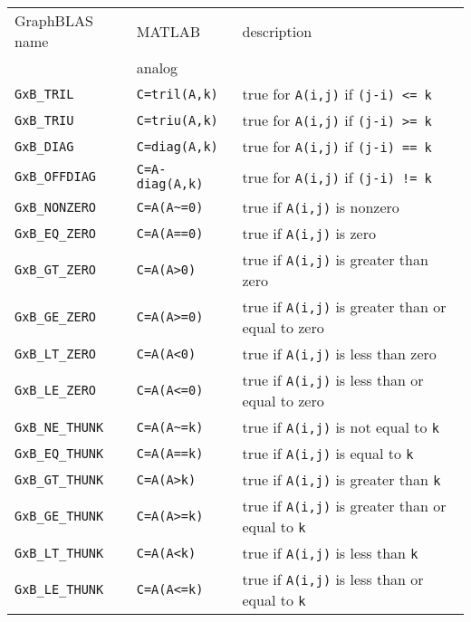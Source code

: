 \documentclass[12pt]{article}
\begin{document}
\vspace{0.2in}
{\footnotesize
\begin{tabular}{lll}
\hline
GraphBLAS name          & MATLAB            & description \\
                        & analog            & \\
\hline
\verb'GxB_TRIL'         & \verb'C=tril(A,k)'   & true for \verb'A(i,j)' if \verb'(j-i) <= k' \\
\verb'GxB_TRIU'         & \verb'C=triu(A,k)'   & true for \verb'A(i,j)' if \verb'(j-i) >= k' \\
\verb'GxB_DIAG'         & \verb'C=diag(A,k)'   & true for \verb'A(i,j)' if \verb'(j-i) == k' \\
\verb'GxB_OFFDIAG'      & \verb'C=A-diag(A,k)' & true for \verb'A(i,j)' if \verb'(j-i) != k' \\
\hline
\verb'GxB_NONZERO'      & \verb'C=A(A~=0)'     & true if \verb'A(i,j)' is nonzero\\
\verb'GxB_EQ_ZERO'      & \verb'C=A(A==0)'     & true if \verb'A(i,j)' is zero\\
\verb'GxB_GT_ZERO'      & \verb'C=A(A>0)'      & true if \verb'A(i,j)' is greater than zero \\
\verb'GxB_GE_ZERO'      & \verb'C=A(A>=0)'     & true if \verb'A(i,j)' is greater than or equal to zero \\
\verb'GxB_LT_ZERO'      & \verb'C=A(A<0)'      & true if \verb'A(i,j)' is less than zero \\
\verb'GxB_LE_ZERO'      & \verb'C=A(A<=0)'     & true if \verb'A(i,j)' is less than or equal to zero \\
\hline
\verb'GxB_NE_THUNK'     & \verb'C=A(A~=k)'     & true if \verb'A(i,j)' is not equal to \verb'k'\\
\verb'GxB_EQ_THUNK'     & \verb'C=A(A==k)'     & true if \verb'A(i,j)' is equal to \verb'k'\\
\verb'GxB_GT_THUNK'     & \verb'C=A(A>k)'      & true if \verb'A(i,j)' is greater than \verb'k' \\
\verb'GxB_GE_THUNK'     & \verb'C=A(A>=k)'     & true if \verb'A(i,j)' is greater than or equal to \verb'k' \\
\verb'GxB_LT_THUNK'     & \verb'C=A(A<k)'      & true if \verb'A(i,j)' is less than \verb'k' \\
\verb'GxB_LE_THUNK'     & \verb'C=A(A<=k)'     & true if \verb'A(i,j)' is less than or equal to \verb'k' \\
%
\hline
\end{tabular}
}
\vspace{0.2in}
\end{document}

